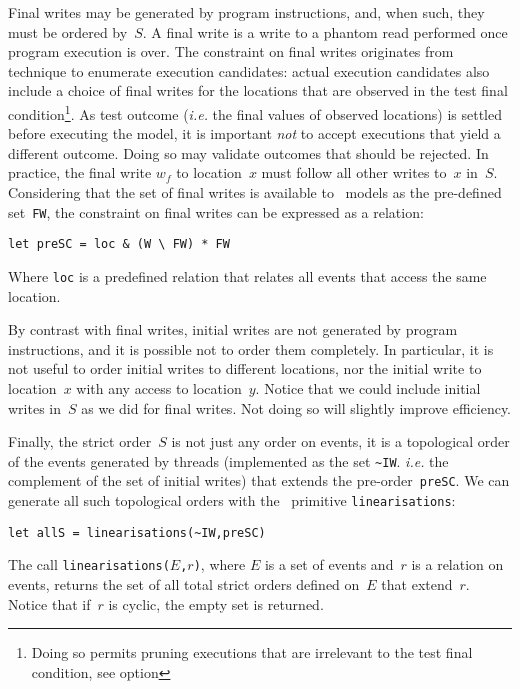Final writes may be  generated by program instructions, and, when such,
they must be ordered by~$S$.
A final write is a write to a phantom read performed once
program execution is over.
The constraint on final writes
originates from \herd{} technique to enumerate execution candidates:
actual execution candidates also include a choice of final writes for
the locations that are observed in the test final condition\footnote{Doing
so permits pruning executions that are irrelevant to the test final condition,
see \herd{} option }.
As test outcome (\emph{i.e.} the final values of observed locations) is
settled before executing the model, it is important \emph{not} to accept
executions that yield a different outcome. Doing so may validate outcomes
that should be rejected.
In practice, the final write $w_f$
to location~$x$ must follow all other writes to~$x$ in~$S$.
Considering that the set of final writes is available to \cat{}~models
as the pre-defined set~\verb+FW+,
the  constraint on final writes
can be expressed as a relation:
\begin{verbatim}
let preSC = loc & (W \ FW) * FW
\end{verbatim}
Where \verb+loc+ is a predefined relation that relates all events
that access the same location.

By contrast with final writes, initial writes are not generated
by program instructions, and it is possible not to order them completely.
In particular, it is not useful to order initial writes to different locations,
nor the initial write to location~$x$ with any access to location~$y$.
Notice that we could include initial writes in~$S$ as we did for
final writes. Not doing so will slightly improve efficiency.

\label{intro:linearisations}%
Finally, the strict order~$S$ is not just any order on events,
it is a topological order of the events generated by threads
(implemented as the set \verb+~IW+. \emph{i.e.} the complement of the set
of initial writes) that extends the pre-order~\verb+preSC+.
We can generate all such topological orders with the \cat{}~primitive
\verb+linearisations+:
\begin{verbatim}
let allS = linearisations(~IW,preSC)
\end{verbatim}
The call \texttt{linearisations($E$,$r$)}, where $E$ is a set of events
and~$r$ is a relation on events, returns the set of all total
strict orders defined on~$E$ that extend~$r$. Notice that if~$r$ is cyclic,
the empty set is  returned.

